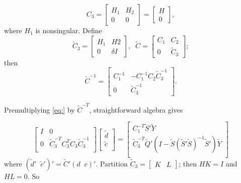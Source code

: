 \documentclass[12pt]{article}
\newcommand{\tildeS}{\tilde{S}}
\newcommand{\tildeY}{\tilde{Y}}
\newcommand{\tildeQ}{\tilde{Q}}
\theoremstyle{definition}
\begin{document}
\begin{equation*}
C_3 = \begin{bmatrix} H_1 & H_2 \\ 0 & 0 \end{bmatrix} = \begin{bmatrix} H \\  0 \end{bmatrix},
\end{equation*}
\noindent
where $H_1$ is nonsingular. Define
\begin{equation} \label{eq:cholesky-factor-mod}
\tilde{C}_3 = \begin{bmatrix}
H_1 & H2 \\
0  & \delta I 
\end{bmatrix}, \;\;
\tilde{C} = \begin{bmatrix}
C_1 & C_2 \\
0  & \tilde{C}_3 
\end{bmatrix};
\end{equation}
\noindent
then
\begin{equation} \label{eq:cholesky-factor-mod-inverse}
\tilde{C}^{-1} = \begin{bmatrix}
C_1^{-1} & -C_1^{-1} C_2 \tilde{C}_3^{-1} \\
0  & \tilde{C}_3^{-1}
\end{bmatrix}.
\end{equation}

Premultiplying \ref{eq:} by $\tilde{C}^{-T}$, straightforward algebra gives 

\begin{equation} \label{eq:vectorized-normal-equations-cholesky}
\begin{bmatrix}
I & 0 \\
0 & \tilde{C}_3^{-T} C_3^{T} C_3 \tilde{C}_3^{-1}\\
\end{bmatrix}
\begin{bmatrix}
\tilde{d}\\
\tilde{c}\\
\end{bmatrix}
= \begin{bmatrix}
C_1^{-T} \tildeS'\tildeY \\
\tilde{C}_3^{-T} \tildeQ'\left( I - \tildeS\left( \tildeS' \tildeS \right)^{-1} \tildeS' \right) \tildeY\\
\end{bmatrix}
\end{equation}
\noindent
where $\left( \tilde{d}'\;\;\tilde{c}' \right)' =  \tilde{C}' \left( d\;\;c \right)'$. Partition $\tilde{C}_3 = \begin{bmatrix} K &  L\end{bmatrix}$; then $HK = I$ and $HL = 0$. So
\end{document}
